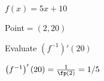 {$f(x) = 5x+10$

Point$=(2,20)$ 

Evaluate $\left(f^{-1}\right)'(20)$}
{$\left(f^{-1}\right)'(20) = \frac{1}{\fp(2)} = 1/5$
}
